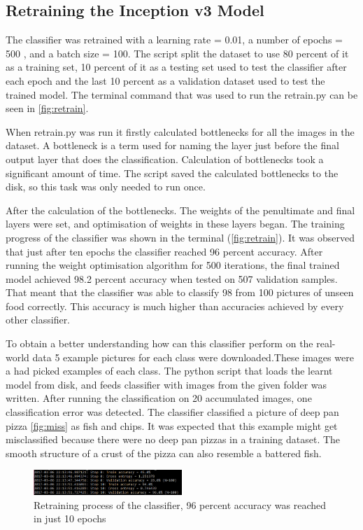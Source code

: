 \subsection{ Retraining the Inception v3 Model}

The classifier was retrained with a learning rate = 0.01, a number of epochs = 500 , and a batch size = 100. The script split the dataset to use 80 percent of it as a training set, 10 percent of it as a testing set used to test the classifier after each epoch and the last 10 percent as a validation dataset used to test the trained model. The terminal command that was used to run the retrain.py can be seen in \autoref{fig:retrain}.

When retrain.py was run it firstly calculated bottlenecks for all the images in the dataset. A bottleneck is a term used for naming the layer just before the final output layer that does the classification. Calculation of bottlenecks took a significant amount of time. The script saved the calculated bottlenecks to the disk, so this task was only needed to run once.

After the calculation of the bottlenecks. The weights of the penultimate and final layers were set, and optimisation of weights in these layers began. The training progress of the classifier was shown in the terminal (\autoref{fig:retrain}). It was observed that just after ten epochs the classifier reached 96 percent accuracy.  After running the weight optimisation algorithm for 500 iterations, the final trained model achieved 98.2 percent accuracy when tested on 507 validation samples. That meant that the classifier was able to classify 98 from 100 pictures of unseen food correctly.  This accuracy is much higher than accuracies achieved by every other classifier.

To obtain a better understanding how can this classifier perform on the real-world data 5 example pictures for each class were downloaded.These images were a had picked examples of each class. The python script that loads the learnt model from disk, and feeds classifier with images from the given folder was written. After running the classification on 20 accumulated images, one classification error was detected. The classifier classified a picture of deep pan pizza \autoref{fig:miss} as fish and chips. It was expected that this example might get misclassified because there were no deep pan pizzas in a training dataset. The smooth structure of a crust of the pizza can also resemble a battered fish. 


\begin{figure}[h]
\centering
\includegraphics[width=0.5\textwidth]{Figures/4/term-train.PNG}
\caption{Retraining process of the classifier, 96 percent accuracy was reached in just 10 epochs}
\label{fig:retrain-2}
\end{figure}

